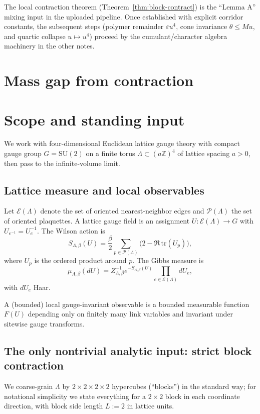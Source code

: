 \documentclass[11pt]{article}
\theoremstyle{definition}
\newcommand{\tr}{\mathrm{tr}}
\newcommand{\1}{\mathbf{1}}
\begin{document}
The local contraction theorem (Theorem~\ref{thm:block-contract}) is the ``Lemma A'' mixing input in the uploaded pipeline. Once established with explicit corridor constants, the subsequent steps (polymer remainder $\varepsilon u^4$, cone invariance $\theta\le Mu$, and quartic collapse $u\mapsto u^4$) proceed by the cumulant/character algebra machinery in the other notes.

\section{Mass gap from contraction}\label{sec:gap}
\section{Scope and standing input}

We work with four-dimensional Euclidean lattice gauge theory with compact gauge group $G=\mathrm{SU}(2)$ on a finite torus $\Lambda\subset (a\mathbb{Z})^4$ of lattice spacing $a>0$, then pass to the infinite-volume limit.

\subsection{Lattice measure and local observables}
Let $\mathcal{E}(\Lambda)$ denote the set of oriented nearest-neighbor edges and $\mathcal{P}(\Lambda)$ the set of oriented plaquettes. A lattice gauge field is an assignment $U:\mathcal{E}(\Lambda)\to G$ with $U_{e^{-1}}=U_e^{-1}$. The Wilson action is
\begin{equation}
S_{\Lambda,\beta}(U)
= \frac{\beta}{2}\sum_{p\in\mathcal{P}(\Lambda)} \Big(2-\Re\,\tr(U_p)\Big),
\end{equation}
where $U_p$ is the ordered product around $p$. The Gibbs measure is
\begin{equation}
\mu_{\Lambda,\beta}(dU) = Z_{\Lambda,\beta}^{-1} e^{-S_{\Lambda,\beta}(U)}\prod_{e\in\mathcal{E}(\Lambda)} dU_e,
\end{equation}
with $dU_e$ Haar.

A (bounded) local gauge-invariant observable is a bounded measurable function $F(U)$ depending only on finitely many link variables and invariant under sitewise gauge transforms.

\subsection{The only nontrivial analytic input: strict block contraction}
We coarse-grain $\Lambda$ by $2\times2\times2\times2$ hypercubes (``blocks'') in the standard way; for notational simplicity we state everything for a $2\times2$ block in each coordinate direction, with block side length $L:=2$ in lattice units.
\end{document}
